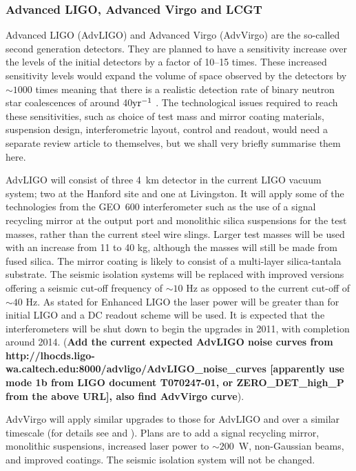 \documentclass{article}
\begin{document}
\subsubsection{Advanced LIGO, Advanced Virgo and LCGT}
Advanced LIGO (AdvLIGO) \cite{AdvLIGO, AdvLIGOweb} and Advanced Virgo (AdvVirgo)
\cite{AdvVirgo, AdvVirgoweb}  are the so-called second generation detectors.
They are planned to have a sensitivity increase over the levels of the initial
detectors by a factor of 10--15 times. These increased sensitivity levels would
expand the volume of space observed by the detectors by $\sim1000$ times meaning
that there is a realistic detection rate of binary neutron star coalescences of
around 40${\rm yr}^{-1}$ \cite{Kopparapu:2008}. The technological issues
required to reach these sensitivities, such as choice of test mass and mirror
coating materials, suspension design, interferometric layout, control and
readout, would need a separate review article to themselves, but we shall very
briefly summarise them here.

AdvLIGO will consist of three 4~km detector in the current LIGO vacuum system;
two at the Hanford site and one at Livingston. It will apply some of the
technologies from the GEO~600 interferometer such as the use of a signal
recycling mirror at the output port and monolithic silica suspensions for the
test masses, rather than the current steel wire slings. Larger test masses will
be used with an increase from 11 to 40 kg, although the masses will still be
made from fused silica. The mirror coating is likely to consist of a
multi-layer silica-tantala substrate. The seismic isolation systems will be
replaced with improved versions offering a seismic cut-off frequency of $\sim10$
Hz as opposed to the current cut-off of $\sim40$ Hz. As stated for Enhanced LIGO
the laser power will be greater than for initial LIGO and a DC readout scheme
will be used. It is expected that the interferometers will be shut down to
begin the upgrades in 2011, with completion around 2014. ({\bf Add the current
expected AdvLIGO noise curves from
http://lhocds.ligo-wa.caltech.edu:8000/advligo/AdvLIGO\_noise\_curves
[apparently use mode 1b from LIGO document T070247-01, or ZERO\_DET\_high\_P
from the above URL], also find AdvVirgo curve}).

AdvVirgo will apply similar upgrades to those for AdvLIGO and over a similar
timescale (for details see \cite{AdVwhitepaper} and \cite{AdVdesign}). Plans are
to add a signal recycling mirror, monolithic suspensions, increased laser power
to $\sim200$~W, non-Gaussian beams, and improved coatings. The seismic isolation
system will not be changed.
\end{document}
